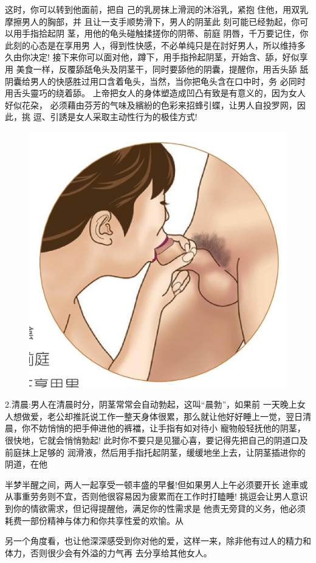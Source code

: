 \documentclass[12pt,UTF8]{ctexbook}
\begin{document}
这时，你可以转到他面前，把自
己的乳房抹上滑润的沐浴乳，紧抱
住他，用双乳摩擦男人的胸部，并
且让一支手顺势滑下，男人的阴茎此
刻可能已经勃起，你可以用手指拾起阴
茎，用他的龟头碰触揉搓你的阴蒂、前庭
阴唇，千万要记住，你此刻的心态是在享用男
人，得到性快感，不必单纯只是在討好男人，所以维持多久由你决定!
接下来你可以面对他，蹲下，用手指拎起阴茎，开始含、舔，好似享用
美食一样，反覆舔舐龟头及阴茎干，同时要舔他的阴囊，提醒你，用舌头舔
舐阴囊给男人的快感胜过用口含着龟头，当然，当你把龟头含在口中时，务
必同时用舌头靈巧的绕着舔。
上帝把女人的身体塑造成凹凸有致是有意义的，因为女人好似花朶，
必须藉由芬芳的气味及繽紛的色彩来招蜂引蝶，让男人自投罗网，因此，挑
逗、引誘是女人采取主动性行为的极佳方式!

\begin{figure}[htbp]
	\centering
	\includegraphics[width=0.7\linewidth]{15}
	\caption{}
	\label{fig:1}
\end{figure}

2.清晨:男人在清晨时分，阴茎常常会自动勃起，这叫“晨勃”，如果前
一天晚上女人想做爱，老公却推託说工作一整天身体很累，那么就让他好好睡上一觉，翌日清晨，你不妨悄悄的把手伸进他的裤襠，让手指有如对待小
寵物般轻抚他的阴茎，很快地，它就会悄悄勃起!
此时你不要只是见獵心喜，要记得先把自己的阴道口及前庭抹上足够的
润滑液，然后用手指托起阴茎，缓缓地坐上去，让阴茎插进你的阴道，在他

半梦半醒之间，两人一起享受一顿丰盛的早餐!但如果男人上午必须要开长
途車或从事重劳务则不宜，否则他很容易因为疲累而在工作时打瞌睡!
挑逗会让男人意识到你的情欲需求，但记得提醒他，满足你的性需求是
他责无旁貸的义务，他必须耗费一部份精神与体力和你共享性爱的欢愉。从

另一个角度看，也让他深深感受到你对他的爱，这样一来，除非他有过人的精力和体力，否则很少会有外溢的力气再
去分享给其他女人。
\end{document}

